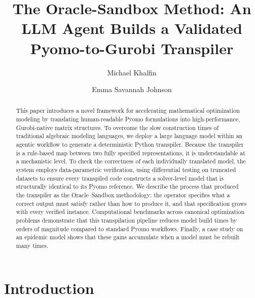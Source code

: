 \documentclass[runningheads]{llncs}
\begin{document}
\title{The Oracle-Sandbox Method: An LLM Agent Builds a Validated Pyomo-to-Gurobi Transpiler}
\author{Michael Khalfin \and
Emma Savannah Johnson}
\maketitle

\begin{abstract}
This paper introduces a novel framework for accelerating mathematical optimization modeling by translating human-readable Pyomo formulations into high-performance, Gurobi-native matrix structures. To overcome the slow construction times of traditional algebraic modeling languages, we deploy a large language model within an agentic workflow to generate a deterministic Python transpiler. Because the transpiler is a rule-based map between two fully specified representations, it is understandable at a mechanistic level. To check the correctness of each individually translated model, the system employs data-parametric verification, using differential testing on truncated datasets to ensure every transpiled code constructs a solver-level model that is structurally identical to its Pyomo reference. We describe the process that produced the transpiler as the Oracle--Sandbox methodology: the operator specifies what a correct output must satisfy rather than how to produce it, and that specification grows with every verified instance. Computational benchmarks across canonical optimization problems demonstrate that this transpilation pipeline reduces model build times by orders of magnitude compared to standard Pyomo workflows. Finally, a case study on an epidemic model shows that these gains accumulate when a model must be rebuilt many times.

\end{abstract}


\section{Introduction}
\end{document}
